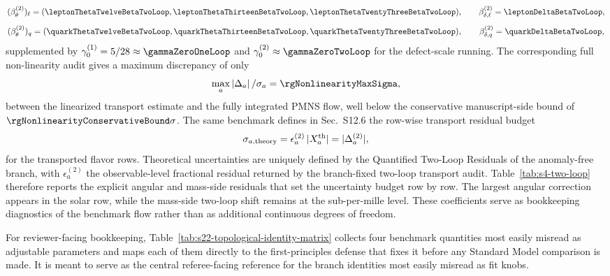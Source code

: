 \documentclass[11pt]{article}
\begin{document}
\begin{equation}
 (\beta^{(2)}_{\theta})_{\ell}=(\leptonThetaTwelveBetaTwoLoop,\leptonThetaThirteenBetaTwoLoop,\leptonThetaTwentyThreeBetaTwoLoop),
 \qquad
 \beta^{(2)}_{\delta,\ell}=\leptonDeltaBetaTwoLoop,
\end{equation}
\begin{equation}
 (\beta^{(2)}_{\theta})_q=(\quarkThetaTwelveBetaTwoLoop,\quarkThetaThirteenBetaTwoLoop,\quarkThetaTwentyThreeBetaTwoLoop),
 \qquad
 \beta^{(2)}_{\delta,q}=\quarkDeltaBetaTwoLoop,
\end{equation}
supplemented by $\gamma_0^{(1)}=5/28\approx\gammaZeroOneLoop$ and $\gamma_0^{(2)}\approx\gammaZeroTwoLoop$ for the defect-scale running. The corresponding full non-linearity audit gives a maximum discrepancy of only
\begin{equation}
 \max_a \left|\Delta_a\right|/\sigma_a = \rgNonlinearityMaxSigma,
\end{equation}
between the linearized transport estimate and the fully integrated PMNS flow, well below the conservative manuscript-side bound of $\rgNonlinearityConservativeBound\sigma$. The same benchmark defines in Sec.~S12.6 the row-wise transport residual budget
\begin{equation}
 \sigma_{a,{\rm theory}}=\epsilon_a^{(2)}\,|X_a^{\rm th}|=|\Delta_a^{(2)}|,
\end{equation}
for the transported flavor rows. Theoretical uncertainties are uniquely defined by the Quantified Two-Loop Residuals of the anomaly-free branch, with $\epsilon_a^{(2)}$ the observable-level fractional residual returned by the branch-fixed two-loop transport audit. Table~\ref{tab:s4-two-loop} therefore reports the explicit angular and mass-side residuals that set the uncertainty budget row by row. The largest angular correction appears in the solar row, while the mass-side two-loop shift remains at the sub-per-mille level. These coefficients serve as bookkeeping diagnostics of the benchmark flow rather than as additional continuous degrees of freedom.

For reviewer-facing bookkeeping,
Table~\ref{tab:s22-topological-identity-matrix} collects four benchmark
quantities most easily misread as adjustable parameters and maps each of them
directly to the first-principles defense that fixes it before any Standard
Model comparison is made. It is meant to serve as the central referee-facing
reference for the branch identities most easily misread as fit knobs.
\end{document}
